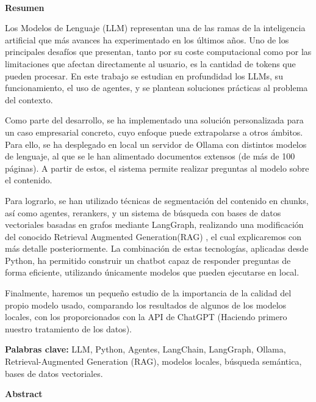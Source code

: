 

\ 

\vskip 2cm

{\noindent\bfseries\Huge Resumen}

\vskip 1cm

Los Modelos de Lenguaje (LLM) representan una de las ramas de la inteligencia artificial que más avances ha experimentado en los últimos años. Uno de los principales desafíos que presentan, tanto por su coste computacional como por las limitaciones que afectan directamente al usuario, es la cantidad de tokens que pueden procesar. En este trabajo se estudian en profundidad los LLMs, su funcionamiento, el uso de agentes, y se plantean soluciones prácticas al problema del contexto.
\\
\vskip 1cm

Como parte del desarrollo, se ha implementado una solución personalizada para un caso empresarial concreto, cuyo enfoque puede extrapolarse a otros ámbitos. Para ello, se ha desplegado en local un servidor de Ollama con distintos modelos de lenguaje, al que se le han alimentado documentos extensos (de más de 100 páginas). A partir de estos, el sistema permite realizar preguntas al modelo sobre el contenido.
\\
\vskip 1cm

Para lograrlo, se han utilizado técnicas de segmentación del contenido en chunks, así como agentes, rerankers, y un sistema de búsqueda con bases de datos vectoriales basadas en grafos mediante LangGraph, realizando una modificación del conocido Retrieval Augmented Generation(RAG) , el cual explicaremos con más detalle posteriormente. La combinación de estas tecnologías, aplicadas desde Python, ha permitido construir un chatbot capaz de responder preguntas de forma eficiente, utilizando únicamente modelos que pueden ejecutarse en local.

\vskip 1cm

Finalmente, haremos un pequeño estudio de la importancia de la calidad del propio modelo usado, comparando los resultados de algunos de los modelos locales, con los proporcionados con la API de ChatGPT (Haciendo primero nuestro tratamiento de los datos).

\textbf{Palabras clave:} LLM, Python, Agentes, LangChain, LangGraph, Ollama, Retrieval-Augmented Generation (RAG), modelos locales, búsqueda semántica, bases de datos vectoriales.

\newpage
\newpage

{\bfseries\Huge Abstract}

